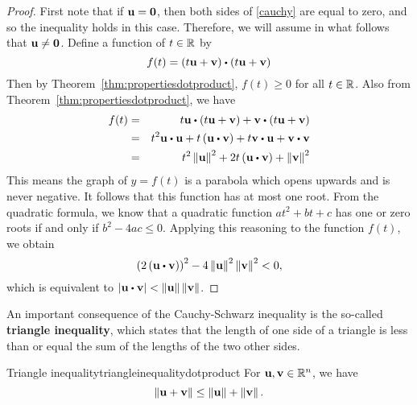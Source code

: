 \begin{proof}
  First note that if $\mbox{\bf u}=\mbox{\bf 0}$, then both sides of
  \eqref{cauchy} are equal to zero, and so the inequality holds in
  this case. Therefore, we will assume in what follows that
  $\mbox{\bf u}\neq \mbox{\bf 0}$.  Define a function of $t\in \mathbb{R}$ by
  \begin{equation*}
    f(t) =\tup{t\vect{u}+\vect{v}} \dotprod \tup{t\vect{u}+
      \vect{v}} 
  \end{equation*}
  Then by Theorem~\ref{thm:propertiesdotproduct}, $f(t) \geq 0$
  for all $t\in \mathbb{R}$.  Also from
  Theorem~\ref{thm:propertiesdotproduct}, we have
  \begin{eqnarray*}
    f(t) &=&t\vect{u}\dotprod \tup{t\vect{u}+\vect{v}} +
                 \vect{v}\dotprod \tup{t\vect{u}+\vect{v}} \\
             &=&t^2\vect{u}\dotprod \vect{u}+t\tup{\vect{u}\dotprod \vect{v}} + t \vect{v}\dotprod \vect{u}+
                 \vect{v}\dotprod \vect{v} \\
             &=&t^2\norm{\vect{u}}^{2}+2t\tup{\vect{u}\dotprod \vect{v}} +\norm{
                 \vect{v}} ^{2}
  \end{eqnarray*}
  This means the graph of $y=f(t)$ is a parabola which opens upwards
  and is never negative. It follows that this function has at most one
  root. From the quadratic formula, we know that a quadratic function
  $at^2+bt+c$ has one or zero roots if and only if $b^2-4ac\leq
  0$. Applying this reasoning to the function $f(t)$, we obtain
  \begin{equation*}
    \tup{2\tup{\vect{u}\dotprod \vect{v}} } ^{2}-4\norm{\vect{u}
    } ^{2}\norm{\vect{v}} ^{2}<0,
  \end{equation*}
  which is equivalent to
  $\abs{\vect{u}\dotprod \vect{v} }<\norm{\vect{u}} \norm{\vect{v}}$.
\end{proof}

An important consequence of the Cauchy-Schwarz inequality is the
so-called \textbf{triangle inequality},
which states that the length of one side of a triangle is less than or
equal the sum of the lengths of the two other sides.

\begin{theorem}{Triangle inequality}{triangleinequalitydotproduct}
  For\/ $\mbox{\bf u},\mbox{\bf v}\in \mathbb{R}^{n}$, we have
  \begin{equation}\label{triangleineq1}
    \left\|\mbox{\bf u}+\mbox{\bf v}\right\| \leq \left\|\mbox{\bf u}\right\| +\left\|\mbox{\bf v}\right\|.
  \end{equation}

  \begin{center}
  \end{center}
\end{theorem}

